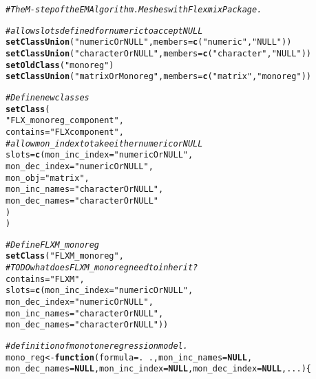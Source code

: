 \documentclass[fleqn,10pt]{olplainarticle}\usepackage[]{graphicx}\usepackage[]{color}
\makeatletter
\newcommand{\hlstr}[1]{\textcolor[rgb]{0.192,0.494,0.8}{#1}}%
\newcommand{\hlcom}[1]{\textcolor[rgb]{0.678,0.584,0.686}{\textit{#1}}}%
\newcommand{\hlopt}[1]{\textcolor[rgb]{0,0,0}{#1}}%
\newcommand{\hlstd}[1]{\textcolor[rgb]{0.345,0.345,0.345}{#1}}%
\newcommand{\hlkwa}[1]{\textcolor[rgb]{0.161,0.373,0.58}{\textbf{#1}}}%
\newcommand{\hlkwb}[1]{\textcolor[rgb]{0.69,0.353,0.396}{#1}}%
\newcommand{\hlkwc}[1]{\textcolor[rgb]{0.333,0.667,0.333}{#1}}%
\newcommand{\hlkwd}[1]{\textcolor[rgb]{0.737,0.353,0.396}{\textbf{#1}}}%
\newenvironment{kframe}{%
 \def\at@end@of@kframe{}%
 \ifinner\ifhmode%
  \def\at@end@of@kframe{\end{minipage}}%
  \begin{minipage}{\columnwidth}%
 \fi\fi%
 \def\FrameCommand##1{\hskip\@totalleftmargin \hskip-\fboxsep
 \colorbox{shadecolor}{##1}\hskip-\fboxsep
     \hskip-\linewidth \hskip-\@totalleftmargin \hskip\columnwidth}%
 \MakeFramed {\advance\hsize-\width
   \@totalleftmargin\z@ \linewidth\hsize
   \@setminipage}}%
 {\par\unskip\endMakeFramed%
 \at@end@of@kframe}
\newenvironment{knitrout}{}{} %
\makeatother
\begin{document}
\begin{appendices}
\begin{knitrout}
\color{fgcolor}\begin{kframe}
\begin{alltt}
\hlcom{# The M-step of the EM Algorithm. Meshes with Flexmix Package.}

\hlcom{# allow slots defined for numeric to accept NULL}
\hlkwd{setClassUnion}\hlstd{(}\hlstr{"numericOrNULL"}\hlstd{,}\hlkwc{members}\hlstd{=}\hlkwd{c}\hlstd{(}\hlstr{"numeric"}\hlstd{,} \hlstr{"NULL"}\hlstd{))}
\hlkwd{setClassUnion}\hlstd{(}\hlstr{"characterOrNULL"}\hlstd{,} \hlkwc{members} \hlstd{=} \hlkwd{c}\hlstd{(}\hlstr{"character"}\hlstd{,} \hlstr{"NULL"}\hlstd{))}
\hlkwd{setOldClass}\hlstd{(}\hlstr{"monoreg"}\hlstd{)}
\hlkwd{setClassUnion}\hlstd{(}\hlstr{"matrixOrMonoreg"}\hlstd{,} \hlkwc{members} \hlstd{=} \hlkwd{c}\hlstd{(}\hlstr{"matrix"}\hlstd{,} \hlstr{"monoreg"}\hlstd{))}

\hlcom{# Define new classes}
\hlkwd{setClass}\hlstd{(}
  \hlstr{"FLX_monoreg_component"}\hlstd{,}
  \hlkwc{contains}\hlstd{=}\hlstr{"FLXcomponent"}\hlstd{,}
  \hlcom{# allow mon_index to take either numeric or NULL}
  \hlkwc{slots}\hlstd{=}\hlkwd{c}\hlstd{(}\hlkwc{mon_inc_index}\hlstd{=}\hlstr{"numericOrNULL"}\hlstd{,}
          \hlkwc{mon_dec_index}\hlstd{=}\hlstr{"numericOrNULL"}\hlstd{,}
          \hlkwc{mon_obj}\hlstd{=}\hlstr{"matrix"}\hlstd{,}
          \hlkwc{mon_inc_names}\hlstd{=}\hlstr{"characterOrNULL"}\hlstd{,}
          \hlkwc{mon_dec_names}\hlstd{=}\hlstr{"characterOrNULL"}
          \hlstd{)}
\hlstd{)}

\hlcom{# Define FLXM_monoreg }
\hlkwd{setClass}\hlstd{(}\hlstr{"FLXM_monoreg"}\hlstd{,}
         \hlcom{# TODO what does FLXM_monoreg need to inherit?}
         \hlkwc{contains} \hlstd{=} \hlstr{"FLXM"}\hlstd{,}
         \hlkwc{slots} \hlstd{=} \hlkwd{c}\hlstd{(}\hlkwc{mon_inc_index}\hlstd{=}\hlstr{"numericOrNULL"}\hlstd{,}
                   \hlkwc{mon_dec_index}\hlstd{=}\hlstr{"numericOrNULL"}\hlstd{,}
                   \hlkwc{mon_inc_names}\hlstd{=}\hlstr{"characterOrNULL"}\hlstd{,}
                   \hlkwc{mon_dec_names}\hlstd{=}\hlstr{"characterOrNULL"}\hlstd{))}






\hlcom{# definition of monotone regression model.}
\hlstd{mono_reg} \hlkwb{<-} \hlkwa{function} \hlstd{(}\hlkwc{formula} \hlstd{= .}\hlopt{~}\hlstd{.,} \hlkwc{mon_inc_names} \hlstd{=} \hlkwa{NULL}\hlstd{,}
                      \hlkwc{mon_dec_names} \hlstd{=} \hlkwa{NULL}\hlstd{,} \hlkwc{mon_inc_index}\hlstd{=}\hlkwa{NULL}\hlstd{,} \hlkwc{mon_dec_index}\hlstd{=}\hlkwa{NULL}\hlstd{,} \hlkwc{...}\hlstd{) \{}


\end{alltt}
\end{kframe}
\end{knitrout}
\end{appendices}
\end{document}
